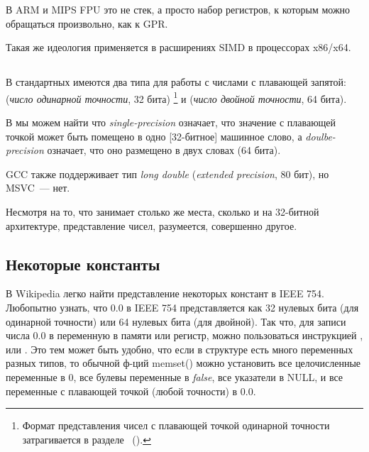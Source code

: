 В ARM и MIPS FPU это не стек, а просто набор регистров, к которым можно обращаться произвольно, как к \ac{GPR}.

Такая же идеология применяется в расширениях SIMD в процессорах x86/x64.

\subsection{\CCpp}

В стандартных \CCpp имеются два типа для работы с числами с плавающей запятой: 
\Tfloat (\emph{число одинарной точности}, 32 бита)
\footnote{Формат представления чисел с плавающей точкой одинарной точности затрагивается в разделе 
\emph{\WorkingWithFloatAsWithStructSubSubSectionName}~().}
и \Tdouble (\emph{число двойной точности}, 64 бита).

В  мы можем найти что \emph{single-precision} означает, что значение с плавающей точкой может быть
помещено в одно [32-битное] машинное слово, а \emph{doulbe-precision} означает, что оно размещено в двух словах (64 бита).

GCC также поддерживает тип \emph{long double} (\emph{extended precision}, 80 бит), но MSVC~--- нет.

Несмотря на то, что \Tfloat занимает столько же места, сколько и \Tint на 32-битной архитектуре, 
представление чисел, разумеется, совершенно другое.





\subsection{Некоторые константы}

В Wikipedia легко найти представление некоторых констант в IEEE 754.
Любопытно узнать, что 0.0 в IEEE 754 представляется как 32 нулевых бита (для одинарной точности) или 64 нулевых бита
(для двойной).
Так что, для записи числа 0.0 в переменную в памяти или регистр, можно пользоваться инструкцией \MOV, или .
Это тем может быть удобно, что если в структуре есть много переменных разных типов, то обычной ф-ций memset()
можно установить все целочисленные переменные в 0, все булевы переменные в \emph{false}, все указатели в NULL,
и все переменные с плавающей точкой (любой точности) в 0.0.

